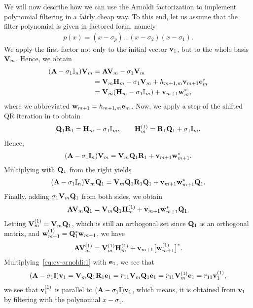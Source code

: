 \begin{intro}
  We will now describe how we can use the Arnoldi factorization to
  implement polynomial filtering in a fairly cheap way. To this end,
  let us assume that the filter polynomial is given in factored form,
  namely
  \begin{gather}
    p(x) = (x-\sigma_p)\dots(x-\sigma_2)(x-\sigma_1).
  \end{gather}
  We apply the first factor not only to the initial vector $\mathbf v_1$,
  but to the whole basis $\mathbf V_m$. Hence, we obtain
  \begin{align}
    (\mathbf A-\sigma_1\mathbb I_n)\mathbf V_m
    &= \mathbf A\mathbf V_m - \sigma_1\mathbf V_m\\
    &= \mathbf V_m\mathbf H_m - \sigma_1 \mathbf V_m + h_{m+1,m} \mathbf v_{m+1} \mathbf e_m^*\\
    &= \mathbf V_m (\mathbf H_m-\sigma_1\mathbb I_m) + \mathbf v_{m+1} \mathbf w_m^*,
  \end{align}
  where we abbreviated $\mathbf w_{m+1} =  h_{m+1,m} \mathbf e_m$.
  Now, we apply a step of the shifted QR iteration in
   to obtain
  \begin{gather}
    \mathbf Q_1\mathbf R_1 = \mathbf H_m-\sigma_1\mathbb I_m,
    \qquad
    \mathbf H_m^{(1)} = \mathbf R_1\mathbf Q_1+\sigma_1\mathbb I_m.
  \end{gather}
  Hence,
  \begin{gather}
    \label{eq:ev-arnoldi:1}
    (\mathbf A-\sigma_1\mathbb I_n)\mathbf V_m = \mathbf V_m \mathbf Q_1\mathbf R_1
    + \mathbf v_{m+1} \mathbf w_{m+1}^*.
  \end{gather}
  Multiplying with $\mathbf Q_1$ from the right yields
  \begin{gather}
    (\mathbf A-\sigma_1\mathbb I_n)\mathbf V_m\mathbf Q_1 = \mathbf V_m \mathbf Q_1 \mathbf R_1\mathbf Q_1
    + \mathbf v_{m+1} \mathbf w_{m+1}^* \mathbf Q_1.
  \end{gather}
  Finally, adding $\sigma_1\mathbf V_m\mathbf Q_1$ from both sides, we obtain
  \begin{gather}
    \mathbf A\mathbf V_m\mathbf Q_1 = \mathbf V_m \mathbf Q_1 \mathbf H_m^{(1)}
    + \mathbf v_{m+1} \mathbf w_{m+1}^* \mathbf Q_1.
  \end{gather}
  Letting $\mathbf V_m^{(1)} = \mathbf V_m\mathbf Q_1$, which is still an orthogonal set since $\mathbf Q_1$ is an orthogonal matrix, and
  $\mathbf w_{m+1}^{(1)} = \mathbf Q_1^*\mathbf w_{m+1}$, we have
  \begin{gather}
    \label{eq:ev-arnoldi:2}
    \mathbf A\mathbf V_m^{(1)} = \mathbf V_m^{(1)} \mathbf H_m^{(1)}
    + \mathbf v_{m+1} \bigl[\mathbf w_{m+1}^{(1)}\bigr]^*.
  \end{gather}
  Multiplying~\eqref{eq:ev-arnoldi:1} with
  $\mathbf e_1$, we see that
  \begin{gather}
    (\mathbf A-\sigma_1\mathbb I) \mathbf v_1 = \mathbf V_m\mathbf Q_1 \mathbf R_1\mathbf e_1
    = r_{11} \mathbf V_m\mathbf Q_1 \mathbf e_1 = r_{11} \mathbf V_m^{(1)} \mathbf e_1
    = r_{11} \mathbf v_1^{(1)},
  \end{gather}
  we see that $\mathbf v_1^{(1)}$ is parallel to
  $(\mathbf A-\sigma_1\mathbb I) \mathbf v_1$, which means, it is obtained from
  $\mathbf v_1$ by filtering with the polynomial $x-\sigma_1$.
  

\end{intro}
